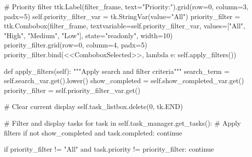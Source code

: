 \documentclass[
  letterpaper,
  DIV=11,
  numbers=noendperiod,
  oneside]{scrreprt}
\newenvironment{Shaded}{}{}
\newcommand{\CommentTok}[1]{\textcolor[rgb]{0.42,0.45,0.49}{#1}}
\newcommand{\ControlFlowTok}[1]{\textcolor[rgb]{0.84,0.23,0.29}{#1}}
\newcommand{\DecValTok}[1]{\textcolor[rgb]{0.00,0.36,0.77}{#1}}
\newcommand{\KeywordTok}[1]{\textcolor[rgb]{0.84,0.23,0.29}{#1}}
\newcommand{\NormalTok}[1]{\textcolor[rgb]{0.14,0.16,0.18}{#1}}
\newcommand{\OperatorTok}[1]{\textcolor[rgb]{0.14,0.16,0.18}{#1}}
\newcommand{\StringTok}[1]{\textcolor[rgb]{0.01,0.18,0.38}{#1}}
\newcommand{\VariableTok}[1]{\textcolor[rgb]{0.89,0.38,0.04}{#1}}
\begin{document}
\begin{Shaded}
\begin{Highlighting}[]
    \CommentTok{\# Priority filter}
\NormalTok{    ttk.Label(filter\_frame, text}\OperatorTok{=}\StringTok{"Priority:"}\NormalTok{).grid(row}\OperatorTok{=}\DecValTok{0}\NormalTok{, column}\OperatorTok{=}\DecValTok{3}\NormalTok{, padx}\OperatorTok{=}\DecValTok{5}\NormalTok{)}
    \VariableTok{self}\NormalTok{.priority\_filter\_var }\OperatorTok{=}\NormalTok{ tk.StringVar(value}\OperatorTok{=}\StringTok{"All"}\NormalTok{)}
\NormalTok{    priority\_filter }\OperatorTok{=}\NormalTok{ ttk.Combobox(filter\_frame, textvariable}\OperatorTok{=}\VariableTok{self}\NormalTok{.priority\_filter\_var,}
\NormalTok{                                  values}\OperatorTok{=}\NormalTok{[}\StringTok{"All"}\NormalTok{, }\StringTok{"High"}\NormalTok{, }\StringTok{"Medium"}\NormalTok{, }\StringTok{"Low"}\NormalTok{], }
\NormalTok{                                  state}\OperatorTok{=}\StringTok{"readonly"}\NormalTok{, width}\OperatorTok{=}\DecValTok{10}\NormalTok{)}
\NormalTok{    priority\_filter.grid(row}\OperatorTok{=}\DecValTok{0}\NormalTok{, column}\OperatorTok{=}\DecValTok{4}\NormalTok{, padx}\OperatorTok{=}\DecValTok{5}\NormalTok{)}
\NormalTok{    priority\_filter.bind(}\StringTok{\textquotesingle{}\textless{}\textless{}ComboboxSelected\textgreater{}\textgreater{}\textquotesingle{}}\NormalTok{, }\KeywordTok{lambda}\NormalTok{ e: }\VariableTok{self}\NormalTok{.apply\_filters())}

\KeywordTok{def}\NormalTok{ apply\_filters(}\VariableTok{self}\NormalTok{):}
    \CommentTok{"""Apply search and filter criteria"""}
\NormalTok{    search\_term }\OperatorTok{=} \VariableTok{self}\NormalTok{.search\_var.get().lower()}
\NormalTok{    show\_completed }\OperatorTok{=} \VariableTok{self}\NormalTok{.show\_completed\_var.get()}
\NormalTok{    priority\_filter }\OperatorTok{=} \VariableTok{self}\NormalTok{.priority\_filter\_var.get()}
    
    \CommentTok{\# Clear current display}
    \VariableTok{self}\NormalTok{.task\_listbox.delete(}\DecValTok{0}\NormalTok{, tk.END)}
    
    \CommentTok{\# Filter and display tasks}
    \ControlFlowTok{for}\NormalTok{ task }\KeywordTok{in} \VariableTok{self}\NormalTok{.task\_manager.get\_tasks():}
        \CommentTok{\# Apply filters}
        \ControlFlowTok{if} \KeywordTok{not}\NormalTok{ show\_completed }\KeywordTok{and}\NormalTok{ task.completed:}
            \ControlFlowTok{continue}
        
        \ControlFlowTok{if}\NormalTok{ priority\_filter }\OperatorTok{!=} \StringTok{"All"} \KeywordTok{and}\NormalTok{ task.priority }\OperatorTok{!=}\NormalTok{ priority\_filter:}
            \ControlFlowTok{continue}
        

\end{Highlighting}
\end{Shaded}
\end{document}
